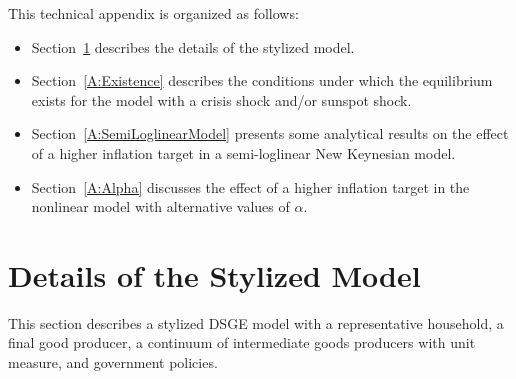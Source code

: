 \documentclass[11pt]{article}
\begin{document}
	\begin{singlespace}
		
		\vspace{2em}
		\noindent This technical appendix is organized as follows:
		\begin{itemize}
			\item Section~\ref{A:Details_Stylized} describes the details of the stylized model.
			\item Section~\ref{A:Existence} describes the conditions under which the equilibrium exists for the model with a crisis shock and/or sunspot shock. 
			\item Section~\ref{A:SemiLoglinearModel} presents some analytical results on the effect of a higher inflation target in a semi-loglinear New Keynesian model.
			\item Section~\ref{A:Alpha} discusses the effect of a higher inflation target in the nonlinear model with alternative values of $\alpha$.
		\end{itemize}
		
		\section{Details of the Stylized Model}
		\label{A:Details_Stylized}
		
		\normalsize{This section describes a stylized DSGE model with a representative household, a final good producer, a continuum of intermediate goods producers with unit measure, and government policies.}
		

\end{singlespace}
\end{document}
